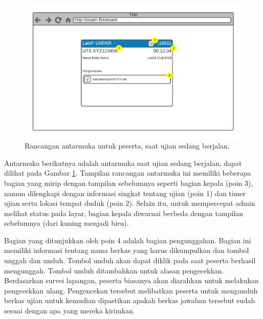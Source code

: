     \begin{figure}
        \centering
        \includegraphics[width=0.7\paperwidth]{Gambar/mockups/Mockup--Peserta - Startstate.pdf}
        \caption{Rancangan antarmuka untuk peserta, saat ujian sedang berjalan.}
        \label{fig:mockup_peserta_activestate}
    \end{figure}
    Antarmuka berikutnya adalah antarmuka saat ujian sedang berjalan, dapat
    dilihat pada Gambar \ref{fig:mockup_peserta_activestate}. Tampilan rancangan
    antarmuka ini memiliki beberapa bagian yang mirip dengan tampilan sebelumnya
    seperti bagian kepala (poin 3), namun dilengkapi dengan informasi singkat
    tentang ujian (poin 1) dan timer ujian serta lokasi tempat duduk (poin 2).
    Selain itu, untuk mempercepat admin melihat status pada layar, bagian kepala
    diwarnai berbeda dengan tampilan sebelumnya (dari kuning menjadi biru).
    
    Bagian yang ditunjukkan oleh poin 4 adalah bagian pengunggahan. Bagian ini
    memiliki informasi tentang nama berkas yang harus dikumpulkan dan tombol
    unggah dan unduh. Tombol unduh akan dapat diklik pada saat peserta berhasil
    mengunggah. Tombol unduh ditambahkan untuk alasan pengecekkan. Berdasarkan
    survei lapangan, peserta biasanya akan diarahkan untuk melakukan pengecekkan
    ulang. Pengencekan tersebut melibatkan peserta untuk mengunduh berkas ujian
    untuk kemudian dipastikan apakah berkas jawaban tersebut sudah sesuai dengan
    apa yang mereka kirimkan.
    
